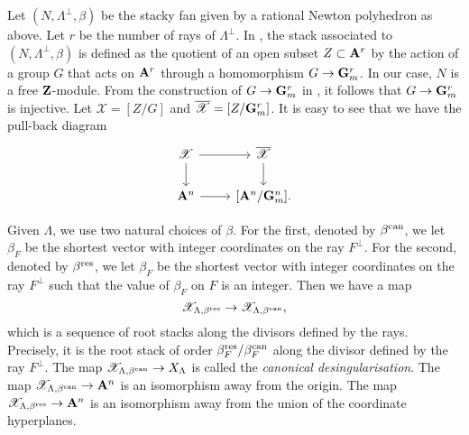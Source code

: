 \documentclass{amsart}
\begin{document}
\begin{remark}\label{rem:eqvblowup}
  Let \((N, \Lambda^{\perp}, \beta)\) be the stacky fan given by a rational Newton polyhedron as above.
  Let \(r\) be the number of rays of \(\Lambda^{\perp}\).
  In \cite{bor.che.smi:05}, the stack associated to \((N, \Lambda^{\perp}, \beta)\) is defined as the quotient of an open subset \(Z \subset {\bf A}^r\) by the action of a group \(G\) that acts on \({\bf A}^{r}\) through a homomorphism \(G \to {\bf G}_m^r\).
  In our case, \(N\) is a free \({\bf Z}\)-module.
  From the construction of \(G \to {\bf G}_m^r\) in \cite[\S~2]{bor.che.smi:05}, it follows that \(G \to {\bf G}_m^r\) is injective.
  Let \(\mathscr X = [Z/G]\) and \(\overline{\mathscr X} = [Z/{\bf G}_m^r]\).
  It is easy to see that we have the pull-back diagram
  \[
    \begin{tikzcd}
      \mathscr X \ar{r}\ar{d} & \overline{\mathscr X}\ar{d} \\
      \A^n\ar{r} & {[\A^{n}/\Gm^n]}.
    \end{tikzcd}
  \]
\end{remark}


Given \(\Lambda\), we use two natural choices of \(\beta\).
For the first, denoted by \(\beta^{\rm can}\), we let \(\beta_F\) be the shortest vector with integer coordinates on the ray \(F^{\perp}\).
For the second, denoted by \(\beta^{\rm res}\), we let \(\beta_F\) be the shortest vector with integer coordinates on the ray \(F^{\perp}\) such that the value of \(\beta_F\) on \(F\) is an integer.
Then we have a map
\[ \mathscr X_{\Lambda, \beta^{\rm res}} \to \mathscr X_{\Lambda, \beta^{\rm can}},\]
which is a sequence of root stacks along the divisors defined by the rays.
Precisely, it is the root stack of order \(\beta^{\rm res}_F / \beta^{\rm can}_F\) along the divisor defined by the ray \(F^{\perp}\).
The map \(\mathscr X_{\Lambda, \beta^{\rm can}} \to X_{\Lambda}\) is called the \emph{canonical desingularisation}.
The map \(\mathscr X_{\Lambda, \beta^{\rm can}} \to {\bf A}^n\) is an isomorphism away from the origin.
The map \(\mathscr X_{\Lambda, \beta^{\rm res}} \to {\bf A}^n\) is an isomorphism away from the union of the coordinate hyperplanes.
\end{document}
